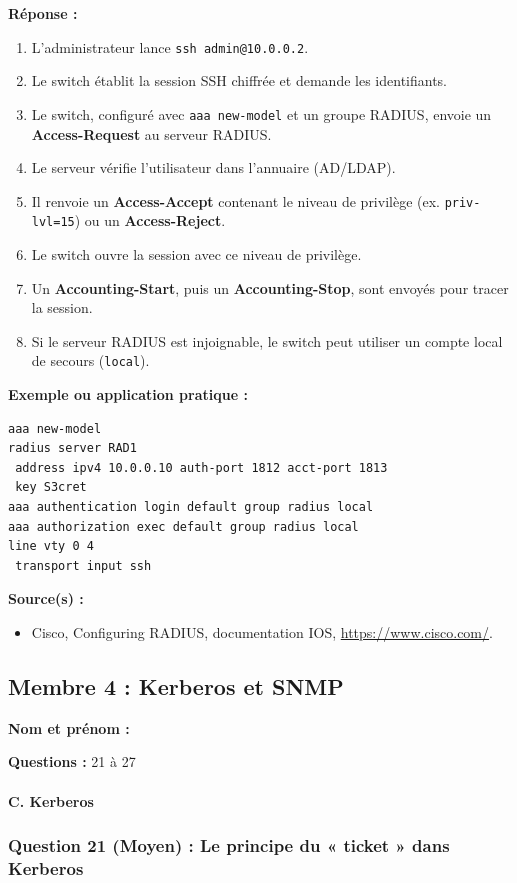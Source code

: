\documentclass[12pt,a4paper]{article}
\newcommand{\membre}[2]{%
  \textbf{Nom et prénom :} #1 \par
  \textbf{Questions :} #2 \par
}
\newcommand{\reponse}{\textbf{Réponse :}\par}
\newcommand{\exemple}{\textbf{Exemple ou application pratique :}\par}
\newcommand{\sources}{\textbf{Source(s) :}}
\begin{document}
\reponse
\begin{enumerate}
    \item L'administrateur lance \texttt{ssh admin@10.0.0.2}.
    \item Le switch établit la session SSH chiffrée et demande les
    identifiants.
    \item Le switch, configuré avec \texttt{aaa new-model} et un groupe
    RADIUS, envoie un \textbf{Access-Request} au serveur RADIUS.
    \item Le serveur vérifie l'utilisateur dans l'annuaire (AD/LDAP).
    \item Il renvoie un \textbf{Access-Accept} contenant le niveau de
    privilège (ex. \texttt{priv-lvl=15}) ou un \textbf{Access-Reject}.
    \item Le switch ouvre la session avec ce niveau de privilège.
    \item Un \textbf{Accounting-Start}, puis un \textbf{Accounting-Stop},
    sont envoyés pour tracer la session.
    \item Si le serveur RADIUS est injoignable, le switch peut utiliser
    un compte local de secours (\texttt{local}).
\end{enumerate}

\exemple
\begin{verbatim}
aaa new-model
radius server RAD1
 address ipv4 10.0.0.10 auth-port 1812 acct-port 1813
 key S3cret
aaa authentication login default group radius local
aaa authorization exec default group radius local
line vty 0 4
 transport input ssh
\end{verbatim}

\sources
\begin{itemize}
    \item Cisco, Configuring RADIUS, documentation IOS,
    \url{https://www.cisco.com/}.
\end{itemize}

\subsection{Membre 4 : Kerberos et SNMP}
\membre{\dotfill}{21 à 27}

\paragraph{C. Kerberos}

\subsubsection*{Question 21 (Moyen) : Le principe du « ticket » dans Kerberos}
\end{document}
